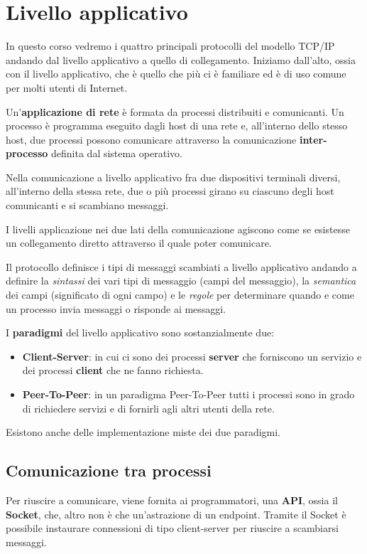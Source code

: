 \chapter{Livello applicativo}
In questo corso vedremo i quattro principali protocolli del modello TCP/IP andando dal livello
applicativo a quello di collegamento. Iniziamo dall'alto, ossia con il livello applicativo, che
è quello che più ci è familiare ed è di uso comune per molti utenti di Internet.

Un'\textbf{applicazione di rete} è formata da processi distribuiti e comunicanti. Un processo è
programma eseguito dagli host di una rete e, all'interno dello stesso host, due processi possono
comunicare attraverso la comunicazione \textbf{inter-processo} definita dal sistema operativo.

Nella comunicazione a livello applicativo fra due dispositivi terminali diversi, all'interno della
stessa rete, due o più processi girano su ciascuno degli host comunicanti e si scambiano messaggi.

I livelli applicazione nei due lati della comunicazione agiscono come se esistesse un collegamento
diretto attraverso il quale poter comunicare.

Il protocollo definisce i tipi di messaggi scambiati a livello applicativo andando a definire la
\emph{sintassi} dei vari tipi di messaggio (campi del messaggio), la \emph{semantica} dei campi
(significato di ogni campo) e le \emph{regole} per determinare quando e come un processo invia
messaggi o risponde ai messaggi.

I \textbf{paradigmi} del livello applicativo sono sostanzialmente due:
\begin{itemize}
	\item \textbf{Client-Server}: in cui ci sono dei processi \textbf{server} che forniscono un
	      servizio e dei processi \textbf{client} che ne fanno richiesta.
	\item \textbf{Peer-To-Peer}: in un paradigma Peer-To-Peer tutti i processi sono in grado di
	      richiedere servizi e di fornirli agli altri utenti della rete.
\end{itemize}
Esistono anche delle implementazione miste dei due paradigmi.

\section{Comunicazione tra processi}
Per riuscire a comunicare, viene fornita ai programmatori, una \textbf{API}, ossia il
\textbf{Socket}, che, altro non è che un'astrazione di un endpoint. Tramite il Socket è possibile
instaurare connessioni di tipo client-server per riuscire a scambiarsi messaggi.

